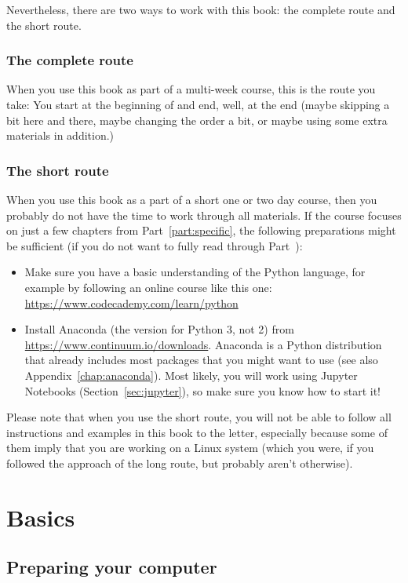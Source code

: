 \documentclass[a4paper,12pt]{book}
\begin{document}
Nevertheless, there are two ways to work with this book: the complete route and the short route.

\section*{The complete route}
When you use this book as part of a multi-week course, this is the route you take: You start at the beginning of and end, well, at the end (maybe skipping a bit here and there, maybe changing the order a bit, or maybe using some extra materials in addition.)

\section*{The short route}
When you use this book as a part of a short one or two day course, then you probably do not have the time to work through all materials. If the course focuses on just a few chapters from Part~\ref{part:specific}, the following preparations might be sufficient (if you do not want to fully read through Part~\ref{part:basics}):
\begin{itemize}
\item Make sure you have a basic understanding of the Python language, for example by following an online course like this one: \url{https://www.codecademy.com/learn/python}
	\item Install Anaconda (the version for Python 3, not 2) from  \url{https://www.continuum.io/downloads}. Anaconda is a Python distribution that already includes most packages that you might want to use (see also Appendix~\ref{chap:anaconda}). Most likely, you will work using Jupyter Notebooks (Section~\ref{sec:jupyter}), so make sure you know how to start it!
\end{itemize}
Please note that when you use the short route, you will not be able to follow all instructions and examples in this book to the letter, especially because some of them imply that you are working on a Linux system (which you were, if you followed the approach of the long route, but probably aren't otherwise).



\mainmatter

\part{Basics}
\label{part:basics}

\chapter{Preparing your computer}
\label{chap:prepare}
\end{document}
